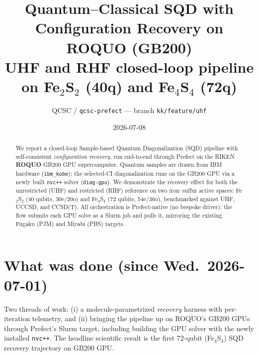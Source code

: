 \documentclass[11pt]{article}
\title{\textbf{Quantum--Classical SQD with Configuration Recovery on ROQUO (GB200)}\\
       \large UHF and RHF closed-loop pipeline on Fe$_2$S$_2$ (40q) and Fe$_4$S$_4$ (72q)}
\author{QCSC / \texttt{qcsc-prefect} --- branch \texttt{kk/feature/uhf}}
\date{2026-07-08}
\begin{document}
\maketitle

\begin{abstract}
We report a closed-loop Sample-based Quantum Diagonalization (SQD) pipeline with
self-consistent \emph{configuration recovery}, run end-to-end through Prefect on the RIKEN
\textbf{ROQUO} GB200 GPU supercomputer. Quantum samples are drawn from IBM hardware
(\texttt{ibm\_kobe}); the selected-CI diagonalization runs on the GB200 GPU via a newly built
\texttt{nvc++} solver (\texttt{diag-gpu}). We demonstrate the recovery effect for both the
unrestricted (UHF) and restricted (RHF) reference on two iron--sulfur active spaces:
Fe$_2$S$_2$ (40 qubits, 30e/20o) and Fe$_4$S$_4$ (72 qubits, 54e/36o), benchmarked against
UHF, UCCSD, and CCSD(T). All orchestration is Prefect-native (no bespoke driver): the flow
submits each GPU solve as a Slurm job and polls it, mirroring the existing Fugaku (PJM) and
Miyabi (PBS) targets.
\end{abstract}

\tableofcontents

\section{What was done (since Wed.\ 2026-07-01)}
Two threads of work: (i) a molecule-parametrized \emph{recovery} harness with per-iteration
telemetry, and (ii) bringing the pipeline up on ROQUO's GB200 GPUs through Prefect's Slurm
target, including building the GPU solver with the newly installed \texttt{nvc++}. The headline
scientific result is the first 72-qubit (Fe$_4$S$_4$) SQD recovery trajectory on GB200 GPU.
\end{document}
